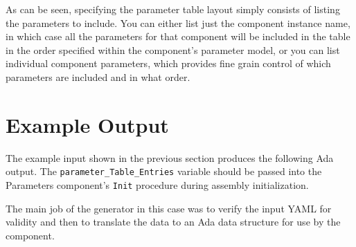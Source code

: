 
As can be seen, specifying the parameter table layout simply consists of listing the parameters to include. You can either list just the component instance name, in which case all the parameters for that component will be included in the table in the order specified within the component's parameter model, or you can list individual component parameters, which provides fine grain control of which parameters are included and in what order.

\section{Example Output}

The example input shown in the previous section produces the following Ada output. The \texttt{parameter\_Table\_Entries} variable should be passed into the Parameters component's \texttt{Init} procedure during assembly initialization.

The main job of the generator in this case was to verify the input YAML for validity and then to translate the data to an Ada data structure for use by the component.



